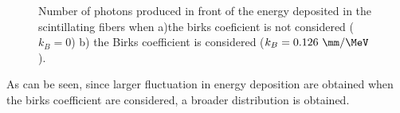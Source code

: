 \begin{figure}[h]
 \centering
 \caption{Number of photons produced in front of the energy deposited in the scintillating fibers when a)the birks coeficient is not considered ($k_B=0$) b) the Birks coefficient is considered ($k_B=0.126~\mm/\MeV$).}
 \label{fig:2DimPlotBirks}
\end{figure}

As can be seen, since larger fluctuation in energy deposition are obtained when the birks coefficient are considered, a broader distribution is obtained.